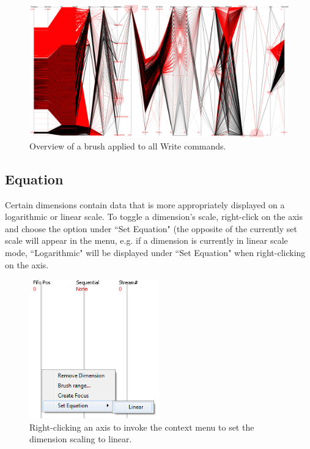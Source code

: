 \documentclass[12pt]{ucthesis}
\begin{document}
\begin{figure}[htb!]
 \centering
 \includegraphics[width=\textwidth]{images/documentation/brush_overview.jpg}
 \caption[Overview of a brush applied to all Write commands.]{Overview of a brush applied to all Write commands.}
 \label{fig:doc}
\end{figure}

\subsection{Equation}
Certain dimensions contain data that is more appropriately displayed on a logarithmic or linear scale. To toggle a dimension's scale, right-click on the axis and choose the option under ``Set Equation" (the opposite of the currently set scale will appear in the menu, e.g. if a dimension is currently in linear scale mode, ``Logarithmic" will be displayed under ``Set Equation" when right-clicking on the axis.

\begin{figure}[htb!]
 \centering
 \includegraphics[width=0.5\textwidth]{images/documentation/set_linear.jpg}
 \caption[Right-clicking an axis to set the dimension scaling to linear.]{Right-clicking an axis to invoke the context menu to set the dimension scaling to linear.}
 \label{fig:doc}
\end{figure}
\end{document}
